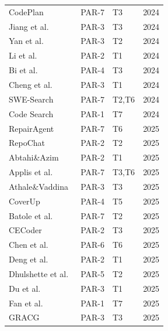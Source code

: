\begin{longtable}{p{5cm}p{1.2cm}p{1.5cm}r}
CodePlan~\cite{bairi2024codeplan}                 & PAR-7 & T3       & 2024 \\
Jiang et al.~\cite{jiang2024enhancing}             & PAR-3 & T3       & 2024 \\
Yan et al.~\cite{yan2024enhancing}                & PAR-3 & T2       & 2024 \\
Li et al.~\cite{li2024enhancing}                  & PAR-2 & T1       & 2024 \\
Bi et al.~\cite{bi2024iterative}                  & PAR-4 & T3       & 2024 \\
Cheng et al.~\cite{cheng2024dataflow}             & PAR-3 & T1       & 2024 \\
SWE-Search~\cite{antoniades2024swesearch}          & PAR-7 & T2,T6    & 2024 \\
Code Search~\cite{chen2024codesearch}             & PAR-1 & T7       & 2024 \\
RepairAgent~\cite{bouzenia2025repairagent}         & PAR-7 & T6       & 2025 \\
RepoChat~\cite{abedu2025repochat}                 & PAR-2 & T2       & 2025 \\
Abtahi\&Azim~\cite{abtahi2025augmenting}          & PAR-2 & T1       & 2025 \\
Applis et al.~\cite{applis2025unified}            & PAR-7 & T3,T6    & 2025 \\
Athale\&Vaddina~\cite{athale2025knowledgegraph}   & PAR-3 & T3       & 2025 \\
CoverUp~\cite{altmayer2025coverup}                & PAR-4 & T5       & 2025 \\
Batole et al.~\cite{batole2025llmbased}            & PAR-7 & T2       & 2025 \\
CECoder~\cite{he2025cecoder}                      & PAR-2 & T3       & 2025 \\
Chen et al.~\cite{chen2025sweexp}                 & PAR-6 & T6       & 2025 \\
Deng et al.~\cite{deng2025enhancing}              & PAR-2 & T1       & 2025 \\
Dhulshette et al.~\cite{dhulshette2025hierarchical}& PAR-5 & T2       & 2025 \\
Du et al.~\cite{du2025dependeval}                 & PAR-3 & T1       & 2025 \\
Fan et al.~\cite{fan2025effective}                & PAR-1 & T7       & 2025 \\
GRACG~\cite{fedorov2025gracg}                     & PAR-3 & T3       & 2025 \\

\end{longtable}
